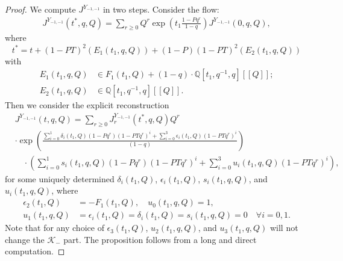 \documentclass[10pt,a4paper]{amsart}
\newcommand{\e}{\epsilon}
\begin{document}
\begin{proof}
We compute $J^{Y_{-1,-1}}$ in two steps. Consider the flow:
\[
\begin{split}
    J^{Y_{-1,-1}}(t^*,q,Q) =\sum_{r\geq 0} Q^r \exp \left( t_1 \frac{1-Pq^r}{1-q} \right) J^{Y_{-1,-1}}(0,q,Q),
\end{split}
\]
where 
\[
    t^* = t + (1-PT)^2(E_1(t_1,q,Q)) + (1-P)(1-PT)^2(E_2(t_1,q,Q))
\]
with
\[
\begin{split}
    E_1(t_1,q,Q) & \in F_1(t_1,Q) + (1-q) \cdot  \mathbb{Q}[t_1,q^{-1},q][\![Q]\!];
    \\
    E_2(t_1,q,Q) & \in \mathbb{Q}[t_1,q^{-1},q][\![Q]\!].
\end{split}
\]
Then we consider the explicit reconstruction
\[
\begin{split}
    &J^{Y_{-1,-1}}(t, q, Q) =  \sum_{r\geq 0}  J_r^{Y_{-1,-1}}(t^*,q,Q) Q^r  
    \\ 
    & \cdot\exp \left( \frac{ \sum_{i=0}^1\delta_i(t_1,Q)(1-Pq^{r})(1-PT q^r)^i + \sum_{i=0}^3 \e_i(t_1,Q) (1-PT q^{r})^i}{(1-q)} \right) 
    \\
    &\quad \cdot\left( \sum_{i=0}^1 s_i(t_1,q,Q)(1-Pq^r)(1-PT q^r)^i + \sum_{i=0}^3 u_i(t_1,q,Q) (1-PTq^r)^i \right),
\end{split}
\]
for some uniquely determined $\delta_i(t_1,Q)$, $\epsilon_i(t_1,Q)$, $s_i(t_1,q,Q)$, and $u_i(t_1,q,Q)$, where
\[
\begin{split}
    \epsilon_2(t_1,Q) &= - F_1(t_1,Q), \quad u_0(t_1,q,Q) = 1,
    \\
    u_1(t_1,q,Q) &=  \epsilon_i(t_1,Q)=\delta_i(t_1,Q)=s_i(t_1,q,Q)=0\quad \forall i=0,1.
\end{split}
\]
Note that for any choice of $\epsilon_3(t_1,Q)$, $u_2(t_1,q,Q)$, and $u_3(t_1,q,Q)$ will not change the $\mathcal{K}_-$ part. The proposition follows from a long and direct computation.
\end{proof}
\end{document}
